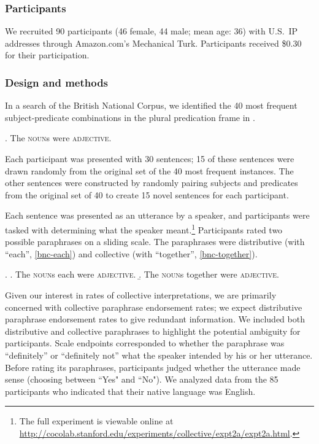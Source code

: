 \documentclass[preprint,12pt,authoryear,titlepage]{elsarticle}
\newcommand{\ndg}[1]{\textcolor{Green}{[ndg: #1]}}
\newcommand{\gcs}[1]{\textcolor{blue}{[gcs: #1]}}
\begin{document}
\subsubsection{Participants}

We recruited 90 participants (46 female, 44 male; mean age: 36) with U.S.~IP addresses through Amazon.com's Mechanical Turk. Participants received \$0.30 for their participation.

\subsubsection{Design and methods}

In a search of the British National Corpus, we identified the 40 most frequent subject-predicate combinations in the plural predication frame in \Next.

\ex. The \textsc{noun}s were \textsc{adjective}.

Each participant was presented with 30 sentences; 15 of these sentences were drawn randomly 
from the original set of the 40 most frequent instances. The other sentences were constructed by randomly pairing subjects and predicates from the original set of 40 to create 15 novel sentences for each participant. 

Each sentence was presented as an utterance by a speaker, and participants were tasked with determining what the speaker meant.\footnote{The full experiment is viewable online at \url{http://cocolab.stanford.edu/experiments/collective/expt2a/expt2a.html}.} Participants rated two possible paraphrases on a sliding scale. The paraphrases were distributive (with ``each'', \ref{bnc-each}) and collective (with ``together'', \ref{bnc-together}). 

\ex. \a. The \textsc{noun}s each were \textsc{adjective}. \label{bnc-each}
\b. The \textsc{noun}s together were \textsc{adjective}. \label{bnc-together}

Given our interest in rates of collective interpretations, we are primarily concerned with collective paraphrase endorsement rates; we expect distributive paraphrase endorsement rates to give redundant information.  We included both distributive and collective paraphrases to highlight the potential ambiguity for participants.
Scale endpoints corresponded to whether the paraphrase was ``definitely'' or ``definitely not'' what the speaker intended by his or her utterance. Before rating its paraphrases, participants judged whether the utterance made sense (choosing between ``Yes" and ``No"). We analyzed data from the 85 participants who indicated that their native language was English.
\end{document}
